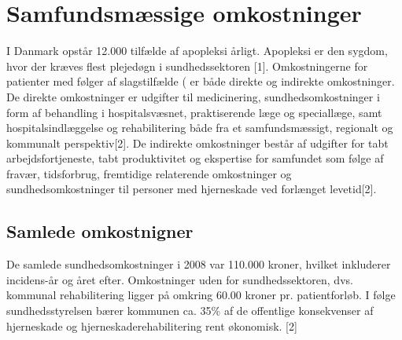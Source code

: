 \section{Samfundsmæssige omkostninger}
I Danmark opstår 12.000 tilfælde af apopleksi årligt. Apopleksi er den sygdom, hvor der kræves flest plejedøgn i sundhedssektoren [1]. %
Omkostningerne for patienter med følger af slagstilfælde (%
er både direkte og indirekte omkostninger. De direkte omkostninger er udgifter til medicinering, sundhedsomkostninger i form af behandling i hospitalsvæsnet, praktiserende læge og speciallæge, samt hospitalsindlæggelse og rehabilitering både fra et samfundsmæssigt, regionalt og kommunalt perspektiv[2]. De indirekte omkostninger  består af udgifter for tabt arbejdsfortjeneste, tabt produktivitet og ekspertise for samfundet som følge af fravær, tidsforbrug, fremtidige relaterende omkostninger og sundhedsomkostninger til personer med hjerneskade ved forlænget levetid[2].

\subsection{Samlede omkostnigner}

De samlede sundhedsomkostninger i 2008 var 110.000 kroner, hvilket inkluderer incidens-år og året efter. Omkostninger uden for sundhedssektoren, dvs. kommunal rehabilitering ligger på omkring 60.00 kroner pr. patientforløb. I følge sundhedsstyrelsen bærer kommunen ca. 35\% af de offentlige konsekvenser af hjerneskade og hjerneskaderehabilitering rent økonomisk. [2]    



